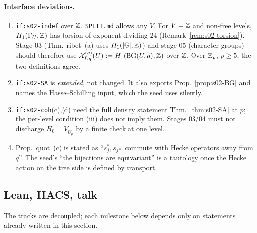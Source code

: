 \paragraph{Interface deviations.}
\begin{enumerate}[label=D\arabic*.]
\item \texttt{if:s02-indef} over $\mathbb{Z}$. \texttt{SPLIT.md} allows any $V$. For $V=\mathbb{Z}$ and non-free levels,
  $H_1(\Gamma_U,\mathbb{Z})$ has torsion of exponent dividing $24$ (Remark~\ref{rem:s02-torsion}). Stage 03
  (Thm.~ribet~(a) uses $H_1(|\mathbb{G}|,\mathbb{Z})$) and stage 05 (character groups) should therefore use
  $\mathcal{X}^{(q)}_{Dq}(U):=H_1(\mathrm{BG}(U,q),\mathbb{Z})$ over $\mathbb{Z}$. Over $\mathbb{Z}_p$, $p\ge5$, the two definitions agree.
\item \texttt{if:s02-SA} is \emph{extended}, not changed. It also exports Prop.~\ref{prop:s02-BG} and names the
  Hasse--Schilling input, which the seed uses silently.
\item \texttt{if:s02-coh}(c),(d) need the full density statement Thm.~\ref{thm:s02-SA} at $p$; the
  per-level condition (iii) does not imply them. Stages 03/04 must not discharge $H_0=V_{U_p^1}$ by a finite
  check at one level.
\item Prop.~quot~(c) is stated as ``$s_j^*,s_{j*}$ commute with Hecke operators away from $q$''. The seed's
  ``the bijections are equivariant'' is a tautology once the Hecke action on the tree side is defined by
  transport.
\end{enumerate}

\subsection{Lean, HACS, talk}\label{ss:s02-tracks}
The tracks are decoupled; each milestone below depends only on statements already written in this section.

